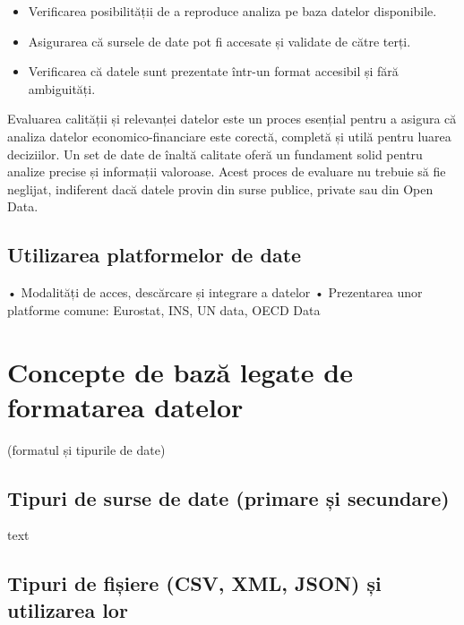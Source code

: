 \documentclass[
  11pt,
  b5paper,
  nottoc]{book}
\providecommand{\tightlist}{%
  \setlength{\itemsep}{0pt}\setlength{\parskip}{0pt}}\usepackage{longtable,booktabs,array}
\begin{document}
\begin{itemize}
\tightlist
\item
  Verificarea posibilității de a reproduce analiza pe baza datelor
  disponibile.\\
\item
  Asigurarea că sursele de date pot fi accesate și validate de către
  terți.\\
\item
  Verificarea că datele sunt prezentate într-un format accesibil și fără
  ambiguități.
\end{itemize}

Evaluarea calității și relevanței datelor este un proces esențial pentru
a asigura că analiza datelor economico-financiare este corectă, completă
și utilă pentru luarea deciziilor. Un set de date de înaltă calitate
oferă un fundament solid pentru analize precise și informații valoroase.
Acest proces de evaluare nu trebuie să fie neglijat, indiferent dacă
datele provin din surse publice, private sau din Open Data.

\hypertarget{utilizarea-platformelor-de-date}{%
\subsection{Utilizarea platformelor de
date}\label{utilizarea-platformelor-de-date}}

• Modalități de acces, descărcare și integrare a datelor • Prezentarea
unor platforme comune: Eurostat, INS, UN data, OECD Data

\hypertarget{concepte-de-bazux103-legate-de-formatarea-datelor}{%
\section{Concepte de bază legate de formatarea
datelor}\label{concepte-de-bazux103-legate-de-formatarea-datelor}}

(formatul și tipurile de date)

\hypertarget{tipuri-de-surse-de-date-primare-ux219i-secundare}{%
\subsection{Tipuri de surse de date (primare și
secundare)}\label{tipuri-de-surse-de-date-primare-ux219i-secundare}}

text

\hypertarget{tipuri-de-fiux219iere-csv-xml-json-ux219i-utilizarea-lor}{%
\subsection{Tipuri de fișiere (CSV, XML, JSON) și utilizarea
lor}\label{tipuri-de-fiux219iere-csv-xml-json-ux219i-utilizarea-lor}}
\end{document}
